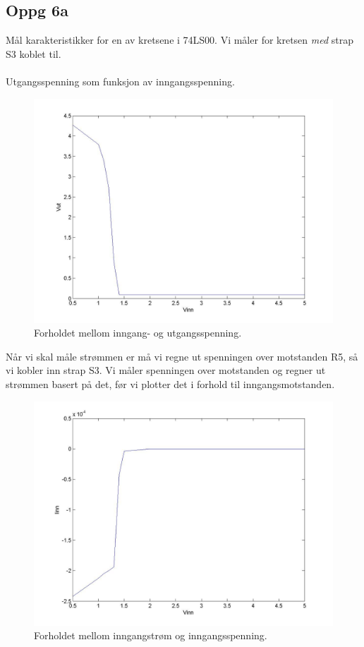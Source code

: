 \subsection{Oppg 6a}
Mål karakteristikker for en av kretsene i 74LS00.
Vi måler for kretsen \emph{med} strap S3 koblet til.
\\\\
Utgangsspenning som funksjon av inngangsspenning.
\begin{figure}[H]
  \caption{Forholdet mellom inngang- og utgangsspenning.}
  \centering
    \includegraphics[width=\textwidth]{6a.jpg}
\end{figure}

Når vi skal måle strømmen er må vi regne ut spenningen over motstanden R5,
så vi kobler inn strap S3.
Vi måler spenningen over motstanden og regner ut strømmen basert på det, før vi
plotter det i forhold til inngangsmotstanden.

\begin{figure}[H]
  \caption{Forholdet mellom inngangstrøm og inngangsspenning.}
  \centering
    \includegraphics[width=\textwidth]{6aa.jpg}
\end{figure}



